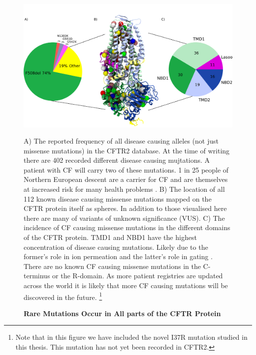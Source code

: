 \begin{figure}
	\begin{center}
	\includegraphics[width=\textwidth]{figures/alleles_pie_chart.pdf}
	\end{center}
	\label{CFTR_structure_domains}
	\captionsetup{singlelinecheck = false, justification=raggedright}
	\caption[Rare Mutations Occur in Across the CFTR Protein] {\textbf{Rare Mutations Occur in All parts of the CFTR Protein}}{A) The reported frequency of all disease causing alleles (not just missense mutations) in the CFTR2 database. At the time of writing there are 402 recorded different disease causing mujtations. A patient with CF will carry two of these mutations. 1 in 25 people of Northern European descent are a carrier for CF and are themselves at increased risk for many health problems \cite{ioannou2014, miller2020}. B) The location of all 112 known disease causing missense mutations mapped on the CFTR protein itself as spheres. In addition to those visualised here there are many of variants of unknown significance (VUS). C) The incidence of CF causing missense mutations in the different domains of the CFTR protein. TMD1 and NBD1 have the highest concentration of disease causing mutations. Likely due to the former's role in ion permeation and the latter's role in gating \cite{cftr2}}. There are no known CF causing missense mutations in the C-terminus or the R-domain. As more patient registries are updated across the world it is likely that more CF causing mutations will be discovered in the future. \footnote{Note that in this figure we have included the novel I37R mutation studied in this thesis. This mutation has not yet been recorded in CFTR2.} 
\end{figure}


